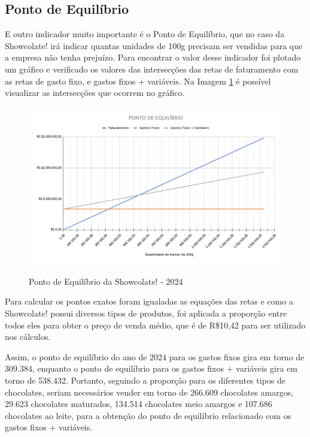 \documentclass[
	12pt,				%
	openright,			%
	oneside,			%
	a4paper,			%
	english,			%
	french,				%
	spanish,			%
	brazil				%
	]{abntex2}
\begin{document}
\subsection{Ponto de Equilíbrio}

E outro indicador muito importante é o Ponto de Equilíbrio, que no caso da Showcolate! irá indicar quantas unidades de 100g precisam ser vendidas para que a empresa não tenha prejuízo. Para encontrar o valor desse indicador foi plotado um gráfico e verificado os valores das intersecções das retas de faturamento com as retas de gasto fixo, e gastos fixos + variáveis. Na Imagem \ref{pq} é possível visualizar as intersecções que ocorrem no gráfico.


\begin{figure}[H]
\begin{center}
\caption{Ponto de Equilíbrio da Showcolate! - 2024} 
\includegraphics[scale=0.3]{a13.png} 
\label{pq}
\end{center}
\end{figure}


Para calcular os pontos exatos foram igualadas as equações das retas e como a Showcolate! possui diversos tipos de produtos, foi aplicada a proporção entre todos eles para obter o preço de venda médio, que é de R\$10,42 para ser utilizado nos cálculos. 

Assim, o ponto de equilíbrio do ano de 2024 para os gastos fixos gira em torno de 309.384, enquanto o ponto de equilíbrio para os gastos fixos + variáveis gira em torno de 538.432. Portanto, seguindo a proporção para os diferentes tipos de chocolates, seriam necessários vender em torno de 266.609 chocolates amargos, 29.623 chocolates maturados, 134.514 chocolates meio amargos e 107.686 chocolates ao leite, para a obtenção do ponto de equilíbrio relacionado com os gastos fixos + variáveis.
\end{document}
